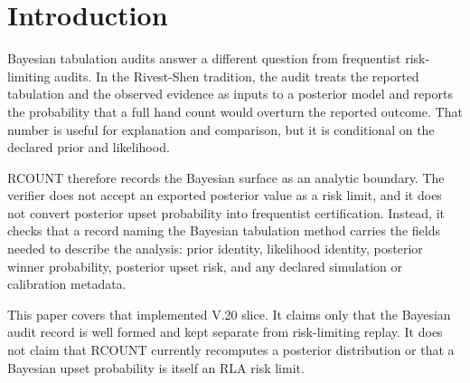 \section{Introduction}

Bayesian tabulation audits answer a different question from frequentist
risk-limiting audits. In the Rivest-Shen tradition, the audit treats the
reported tabulation and the observed evidence as inputs to a posterior model
and reports the probability that a full hand count would overturn the reported
outcome. That number is useful for explanation and comparison, but it is
conditional on the declared prior and likelihood.

RCOUNT therefore records the Bayesian surface as an analytic boundary. The
verifier does not accept an exported posterior value as a risk limit, and it
does not convert posterior upset probability into frequentist certification.
Instead, it checks that a record naming the Bayesian tabulation method carries
the fields needed to describe the analysis: prior identity, likelihood identity,
posterior winner probability, posterior upset risk, and any declared simulation
or calibration metadata.

This paper covers that implemented V.20 slice. It claims only that the Bayesian
audit record is well formed and kept separate from risk-limiting replay. It
does not claim that RCOUNT currently recomputes a posterior distribution or that
a Bayesian upset probability is itself an RLA risk limit.
